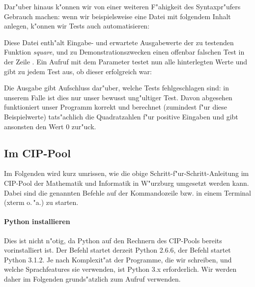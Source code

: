 \documentclass[a4paper,ngerman]{article}
\begin{document}
Dar"uber hinaus k"onnen wir von einer weiteren F"ahigkeit des
Syntaxpr"ufers Gebrauch machen: wenn wir
beispielsweise eine Datei  mit folgendem Inhalt anlegen,
k"onnen wir Tests auch automatisieren:

Diese Datei enth"alt Eingabe- und erwartete Ausgabewerte der zu
testenden Funktion \emph{square}, und zu Demonstrationszwecken einen
offenbar falschen Test in der Zeile . Ein Aufruf mit dem
Parameter  testet nun alle hinterlegten Werte und gibt zu jedem
Test aus, ob dieser erfolgreich war:
Die Ausgabe gibt Aufschluss dar"uber, welche Tests fehlgeschlagen
sind: in unserem Falle ist dies nur unser bewusst ung"ultiger
Test. Davon abgesehen funktioniert unser Programm korrekt und
berechnet (zumindest f"ur diese Beispielwerte) tats"achlich die
Quadratzahlen f"ur positive Eingaben und gibt ansonsten den Wert 0
zur"uck.
\subsection{Im CIP-Pool}
Im Folgenden wird kurz umrissen, wie die obige
Schritt-f"ur-Schritt-Anleitung im CIP-Pool der Mathematik und
Informatik in W"urzburg umgesetzt werden kann. Dabei sind die
genannten Befehle auf der Kommandozeile bzw. in einem Terminal (xterm
o.\,"a.) zu starten.
\paragraph{Python installieren}
Dies ist nicht n"otig, da Python auf den Rechnern des CIP-Pools
bereits vorinstalliert ist. Der Befehl  startet derzeit
Python 2.6.6, der Befehl  startet Python 3.1.2. Je nach
Komplexit"at der Programme, die wir schreiben, und welche
Sprachfeatures sie verwenden, ist Python 3.x erforderlich. Wir werden
daher im Folgenden grunds"atzlich  zum Aufruf verwenden.
\end{document}
